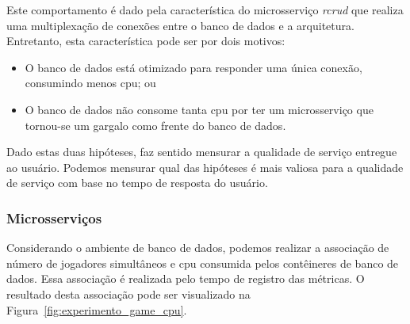 Este comportamento é dado pela característica do microsserviço \textit{rcrud} que realiza uma multiplexação de conexões entre o banco de dados e a arquitetura.
%
Entretanto, esta característica pode ser por dois motivos:

\begin{itemize}
 \item O banco de dados está otimizado para responder uma única conexão, consumindo menos \ac{cpu}; ou
 \item O banco de dados não consome tanta \ac{cpu} por ter um microsserviço que tornou-se um gargalo como frente do banco de dados.
\end{itemize}

Dado estas duas hipóteses, faz sentido mensurar a qualidade de serviço entregue ao usuário.
%
Podemos mensurar qual das hipóteses é mais valiosa para a qualidade de serviço com base no tempo de resposta do usuário.


\subsubsection{Microsserviços}

Considerando o ambiente de banco de dados, podemos realizar a associação de número de jogadores simultâneos e \ac{cpu} consumida pelos contêineres de banco de dados.
%
Essa associação é realizada pelo tempo de registro das métricas.
%
O resultado desta associação pode ser visualizado na Figura~\ref{fig:experimento_game_cpu}.

